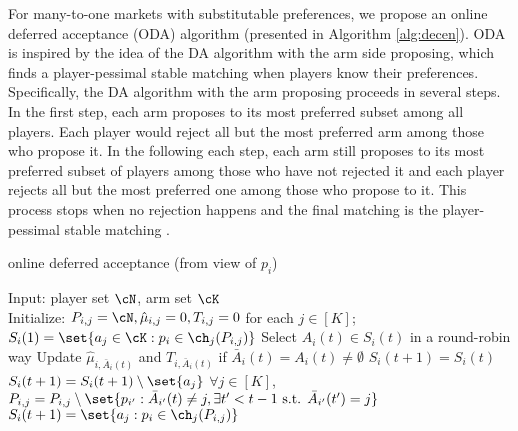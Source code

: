 For many-to-one markets with substitutable preferences, we propose an online deferred acceptance (ODA) algorithm (presented in Algorithm \ref{alg:decen}). ODA is inspired by the idea of the DA algorithm with the arm side proposing, which finds a player-pessimal stable matching when players know their preferences. 
Specifically, the DA algorithm with the arm proposing proceeds in several steps. 
In the first step, each arm proposes to its most preferred subset among all players. 
Each player would reject all but the most preferred arm among those who propose it. 
In the following each step, each arm still proposes to its most preferred subset of players among those who have not rejected it and each player rejects all but the most preferred one among those who propose to it. This process stops when no rejection happens and the final matching is the player-pessimal stable matching \citep{kelso1982job,roth1992two}. 


\begin{algorithm}[thb!]
    \caption{online deferred acceptance (from view of $p_i$)}\label{alg:decen}
    \begin{algorithmic}[1]
    \STATE Input: player set $\cN$, arm set $\cK$ \label{alg:decen:input}\\
        \STATE Initialize: $P_{i,j}=\cN,  \hat{\mu}_{i,j}=0, T_{i,j}=0$ for each $j\in [K]$; $S_i(1)=\set{a_j\in \cK: p_i \in \ch_j(P_{i,j})}$ \label{alg:decen:initial} 
            \STATE Select $A_i(t)\in S_i(t)$ in a round-robin way \label{alg:decen:roundrobin}
            \STATE Update $\hat{\mu}_{i,\bar{A}_i(t)}$ and $T_{i,\bar{A}_i(t)}$ if $\bar{A}_i(t) = A_i(t) \neq \emptyset$
        \label{alg:decen:updatemuT}
            \STATE $S_i(t+1)=S_i(t)$
            \label{alg:decen:delete:suboptimal:condition}
                	\STATE $S_i(t+1) = S_i(t+1)\setminus \set{a_j}$ \label{alg:decen:delete:suboptimal}
            \ENDFOR
                \label{alg:decen:update:available:start}
                    \STATE $\forall j\in[K]$, $P_{i,j} = P_{i,j}\setminus\set{p_{i'}: \bar{A}_{i'}(t)\neq j, \exists t'<t-1 \text{ s.t. } \bar{A}_{i'}(t')=j }$\label{alg:decen:update:available}
                    \STATE $S_{i}(t+1) = \set{a_j: p_i \in \ch_j(P_{i,j}) }$ \label{alg:decen:update:plausible}
                \ENDIF \label{alg:decen:update:available:end}
    \ENDFOR
    \end{algorithmic}
\end{algorithm}




